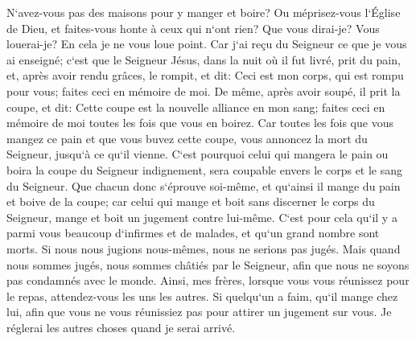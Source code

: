 \verse N`avez-vous pas des maisons pour y manger et boire? Ou méprisez-vous l`Église de Dieu, et faites-vous honte à ceux qui n`ont rien? Que vous dirai-je? Vous louerai-je? En cela je ne vous loue point. 
\verse Car j`ai reçu du Seigneur ce que je vous ai enseigné; c`est que le Seigneur Jésus, dans la nuit où il fut livré, prit du pain, 
\verse et, après avoir rendu grâces, le rompit, et dit: Ceci est mon corps, qui est rompu pour vous; faites ceci en mémoire de moi. 
\verse De même, après avoir soupé, il prit la coupe, et dit: Cette coupe est la nouvelle alliance en mon sang; faites ceci en mémoire de moi toutes les fois que vous en boirez. 
\verse Car toutes les fois que vous mangez ce pain et que vous buvez cette coupe, vous annoncez la mort du Seigneur, jusqu`à ce qu`il vienne. 
\verse C`est pourquoi celui qui mangera le pain ou boira la coupe du Seigneur indignement, sera coupable envers le corps et le sang du Seigneur. 
\verse Que chacun donc s`éprouve soi-même, et qu`ainsi il mange du pain et boive de la coupe; 
\verse car celui qui mange et boit sans discerner le corps du Seigneur, mange et boit un jugement contre lui-même. 
\verse C`est pour cela qu`il y a parmi vous beaucoup d`infirmes et de malades, et qu`un grand nombre sont morts. 
\verse Si nous nous jugions nous-mêmes, nous ne serions pas jugés. 
\verse Mais quand nous sommes jugés, nous sommes châtiés par le Seigneur, afin que nous ne soyons pas condamnés avec le monde. 
\verse Ainsi, mes frères, lorsque vous vous réunissez pour le repas, attendez-vous les uns les autres. 
\verse Si quelqu`un a faim, qu`il mange chez lui, afin que vous ne vous réunissiez pas pour attirer un jugement sur vous. Je réglerai les autres choses quand je serai arrivé. 


